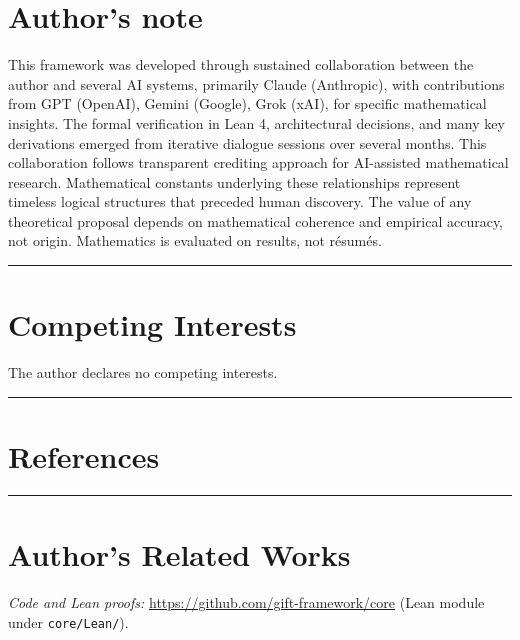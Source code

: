 \documentclass[11pt,a4paper]{article}
\begin{document}
\section{Author's note}

This framework was developed through sustained collaboration between the
author and several AI systems, primarily Claude (Anthropic), with
contributions from GPT (OpenAI), Gemini (Google), Grok (xAI), for
specific mathematical insights. The formal verification in Lean 4,
architectural decisions, and many key derivations emerged from iterative
dialogue sessions over several months. This collaboration follows
transparent crediting approach for AI-assisted mathematical research.
Mathematical constants underlying these relationships represent timeless
logical structures that preceded human discovery. The value of any
theoretical proposal depends on mathematical coherence and empirical
accuracy, not origin. Mathematics is evaluated on results, not résumés.

\noindent

\rule{\textwidth}{0.2pt}

\section{Competing Interests}

The author declares no competing interests.

\noindent

\rule{\textwidth}{0.2pt}

\section*{References}



\noindent

\rule{\textwidth}{0.2pt}

\section*{Author's Related Works}

\noindent\emph{Code and Lean proofs:} \url{https://github.com/gift-framework/core} (Lean module under \texttt{core/Lean/}).
\end{document}
